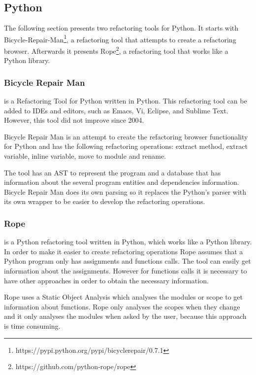 
\subsection{Python}

The following section presents two refactoring tools for Python.
It starts with Bicycle-Repair-Man\footnote{https://pypi.python.org/pypi/bicyclerepair/0.7.1},
 a refactoring tool that attempts to create a refactoring browser.
Afterwards it presents Rope\footnote{https://github.com/python-rope/rope}, a
refactoring tool that works like a Python library.

\subsubsection{Bicycle Repair Man}

 is a Refactoring Tool for Python written in Python.
 This refactoring tool can be added to IDEs and editors, such as Emacs, Vi, Eclipse,
  and Sublime Text. However, this tool did not improve since 2004.

Bicycle Repair Man is an attempt to create the refactoring browser functionality for
 Python and has the following refactoring operations: extract method, extract variable, inline variable, move to module and rename.

The tool has an AST to represent the program and a database that has information
about the several program entities and dependencies information.
Bicycle Repair Man does its own parsing so it replaces the Python's parser with
its own wrapper to be easier to develop the refactoring operations.


\subsubsection{Rope}

 is a Python refactoring tool written in Python, which works like a Python library.
In order to make it easier to create refactoring operations Rope assumes that a
Python program only has assignments and functions calls. %
The tool can easily get information about the assignments.
However for functions calls it is necessary to have other approaches in order to
obtain the necessary information.

Rope uses a Static Object Analysis which analyses the modules or scope to get
information about functions.
Rope only analyses the scopes when they change and it only analyses the modules
when asked by the user, because this approach is time consuming.

